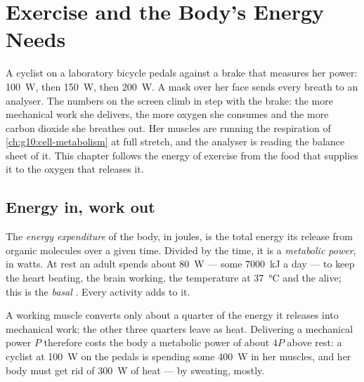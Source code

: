 \chapter{Exercise and the Body's Energy Needs}\label{ch:g10:exercise-and-energy}

A cyclist on a laboratory bicycle pedals against a brake that measures
her power: \qty{100}{W}, then \qty{150}{W}, then \qty{200}{W}. A mask
over her face sends every breath to an analyser. The numbers on the
screen climb in step with the brake: the more mechanical work she
delivers, the more oxygen she consumes and the more carbon dioxide she
breathes out. Her muscles are running the respiration of
\cref{ch:g10:cell-metabolism} at full stretch, and the analyser is
reading the balance sheet of it. This chapter follows the energy of
exercise from the food that supplies it to the oxygen that releases it.

\section{Energy in, work out}

\begin{definition}\label{def:g10:exercise-and-energy:expenditure}
The \emph{energy expenditure} of the body,
in joules, is the total energy its  release from organic
molecules over a given time. Divided by the time, it is a
\emph{metabolic power}, in watts. At rest an adult spends about
\qty{80}{W} --- some \qty{7000}{kJ} a day --- to keep the heart
beating, the brain working, the temperature at \qty{37}{\celsius} and
the  alive; this is the \emph{basal }. Every activity
adds to it.
\end{definition}

\begin{proposition}\label{prop:g10:exercise-and-energy:efficiency}
A working muscle converts only about a quarter of the energy it
releases into mechanical work; the other three quarters leave as heat.
Delivering a mechanical power $P$ therefore costs the body a metabolic
power of about $4P$ above rest: a cyclist at \qty{100}{W} on the pedals
is spending some \qty{400}{W} in her muscles, and her body must get rid
of \qty{300}{W} of heat --- by sweating, mostly.
\end{proposition}
\admitted

